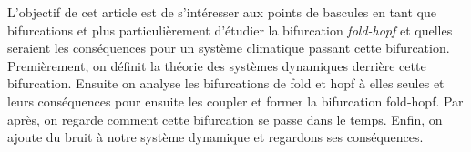 
L'objectif de cet article est de s'intéresser aux points de bascules en tant que bifurcations et plus particulièrement d'étudier la bifurcation \emph{fold-hopf} et quelles seraient les conséquences pour un système climatique passant cette bifurcation. Premièrement, on définit la théorie des systèmes dynamiques derrière cette bifurcation. Ensuite on analyse les bifurcations de fold et hopf à elles seules et leurs conséquences pour ensuite les coupler et former la bifurcation fold-hopf. Par après, on regarde comment cette bifurcation se passe dans le temps. Enfin, on ajoute du bruit à notre système dynamique et regardons ses conséquences.
